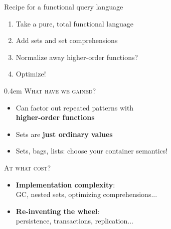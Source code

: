 \documentclass[xcolor=table,usenames,dvipsnames,svgnames]{beamer}
\begin{document}

\begin{frame}{Recipe for a functional query language}\Large

  \begin{enumerate}\itemsep 1.5em
  \item Take a pure, total functional language
  \item Add sets and set comprehensions
  \item Normalize away higher-order functions?
  \item Optimize!
  \end{enumerate}
\end{frame}


\begin{frame}{}\large\parskip 0.4em
  \textsc{What have we gained?}
  \begin{itemize}\itemsep 0.5em
  \item Can factor out repeated patterns with\\ \textbf{higher-order functions}
  \item Sets are \textbf{just ordinary values}
  \item Sets, bags, lists: choose your container semantics!
  \end{itemize}

  \vspace{1em}\pause

  \textsc{At what cost?}
  \begin{itemize}
  \item \textbf{Implementation complexity}:\\
    {\small GC, nested sets, optimizing comprehensions...}
  \item \textbf{Re-inventing the wheel}:\\
    {\small persistence, transactions, replication...}
  \end{itemize}

\end{frame}
\end{document}

